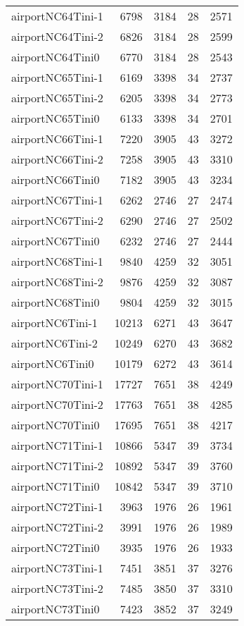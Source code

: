 \documentclass[../../../thesis.tex]{subfiles}
\begin{document}
\begin{longtable}{lrrrr}
airportNC64Tini-1 & 6798 & 3184 & 28 & 2571 \\
airportNC64Tini-2 & 6826 & 3184 & 28 & 2599 \\
airportNC64Tini0 & 6770 & 3184 & 28 & 2543 \\
airportNC65Tini-1 & 6169 & 3398 & 34 & 2737 \\
airportNC65Tini-2 & 6205 & 3398 & 34 & 2773 \\
airportNC65Tini0 & 6133 & 3398 & 34 & 2701 \\
airportNC66Tini-1 & 7220 & 3905 & 43 & 3272 \\
airportNC66Tini-2 & 7258 & 3905 & 43 & 3310 \\
airportNC66Tini0 & 7182 & 3905 & 43 & 3234 \\
airportNC67Tini-1 & 6262 & 2746 & 27 & 2474 \\
airportNC67Tini-2 & 6290 & 2746 & 27 & 2502 \\
airportNC67Tini0 & 6232 & 2746 & 27 & 2444 \\
airportNC68Tini-1 & 9840 & 4259 & 32 & 3051 \\
airportNC68Tini-2 & 9876 & 4259 & 32 & 3087 \\
airportNC68Tini0 & 9804 & 4259 & 32 & 3015 \\
airportNC6Tini-1 & 10213 & 6271 & 43 & 3647 \\
airportNC6Tini-2 & 10249 & 6270 & 43 & 3682 \\
airportNC6Tini0 & 10179 & 6272 & 43 & 3614 \\
airportNC70Tini-1 & 17727 & 7651 & 38 & 4249 \\
airportNC70Tini-2 & 17763 & 7651 & 38 & 4285 \\
airportNC70Tini0 & 17695 & 7651 & 38 & 4217 \\
airportNC71Tini-1 & 10866 & 5347 & 39 & 3734 \\
airportNC71Tini-2 & 10892 & 5347 & 39 & 3760 \\
airportNC71Tini0 & 10842 & 5347 & 39 & 3710 \\
airportNC72Tini-1 & 3963 & 1976 & 26 & 1961 \\
airportNC72Tini-2 & 3991 & 1976 & 26 & 1989 \\
airportNC72Tini0 & 3935 & 1976 & 26 & 1933 \\
airportNC73Tini-1 & 7451 & 3851 & 37 & 3276 \\
airportNC73Tini-2 & 7485 & 3850 & 37 & 3310 \\
airportNC73Tini0 & 7423 & 3852 & 37 & 3249 \\

\end{longtable}
\end{document}
